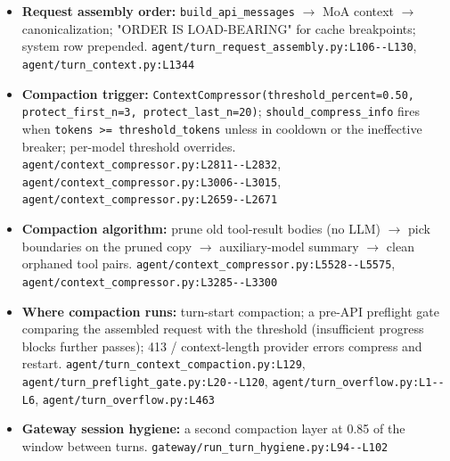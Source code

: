 \begin{itemize}
\item \textbf{Request assembly order:} \texttt{build\_\allowbreak{}api\_\allowbreak{}messages} $\rightarrow$ MoA context $\rightarrow$ canonicalization; "ORDER IS LOAD-BEARING" for cache breakpoints; system row prepended. \texttt{agent/\allowbreak{}turn\_\allowbreak{}request\_\allowbreak{}assembly.\allowbreak{}py:\allowbreak{}L106-\allowbreak{}-\allowbreak{}L130}, \texttt{agent/\allowbreak{}turn\_\allowbreak{}context.\allowbreak{}py:\allowbreak{}L1344}
\item \textbf{Compaction trigger:} \texttt{ContextCompressor(\allowbreak{}threshold\_\allowbreak{}percent=0.\allowbreak{}50, protect\_\allowbreak{}first\_\allowbreak{}n=3, protect\_\allowbreak{}last\_\allowbreak{}n=20)}; \texttt{should\_\allowbreak{}compress\_\allowbreak{}info} fires when \texttt{tokens >= threshold\_\allowbreak{}tokens} unless in cooldown or the ineffective breaker; per-model threshold overrides. \texttt{agent/\allowbreak{}context\_\allowbreak{}compressor.\allowbreak{}py:\allowbreak{}L2811-\allowbreak{}-\allowbreak{}L2832}, \texttt{agent/\allowbreak{}context\_\allowbreak{}compressor.\allowbreak{}py:\allowbreak{}L3006-\allowbreak{}-\allowbreak{}L3015}, \texttt{agent/\allowbreak{}context\_\allowbreak{}compressor.\allowbreak{}py:\allowbreak{}L2659-\allowbreak{}-\allowbreak{}L2671}
\item \textbf{Compaction algorithm:} prune old tool-result bodies (no LLM) $\rightarrow$ pick boundaries on the pruned copy $\rightarrow$ auxiliary-model summary $\rightarrow$ clean orphaned tool pairs. \texttt{agent/\allowbreak{}context\_\allowbreak{}compressor.\allowbreak{}py:\allowbreak{}L5528-\allowbreak{}-\allowbreak{}L5575}, \texttt{agent/\allowbreak{}context\_\allowbreak{}compressor.\allowbreak{}py:\allowbreak{}L3285-\allowbreak{}-\allowbreak{}L3300}
\item \textbf{Where compaction runs:} turn-start compaction; a pre-API preflight gate comparing the assembled request with the threshold (insufficient progress blocks further passes); 413 / context-length provider errors compress and restart. \texttt{agent/\allowbreak{}turn\_\allowbreak{}context\_\allowbreak{}compaction.\allowbreak{}py:\allowbreak{}L129}, \texttt{agent/\allowbreak{}turn\_\allowbreak{}preflight\_\allowbreak{}gate.\allowbreak{}py:\allowbreak{}L20-\allowbreak{}-\allowbreak{}L120}, \texttt{agent/\allowbreak{}turn\_\allowbreak{}overflow.\allowbreak{}py:\allowbreak{}L1-\allowbreak{}-\allowbreak{}L6}, \texttt{agent/\allowbreak{}turn\_\allowbreak{}overflow.\allowbreak{}py:\allowbreak{}L463}
\item \textbf{Gateway session hygiene:} a second compaction layer at 0.85 of the window between turns. \texttt{gateway/\allowbreak{}run\_\allowbreak{}turn\_\allowbreak{}hygiene.\allowbreak{}py:\allowbreak{}L94-\allowbreak{}-\allowbreak{}L102}

\end{itemize}

